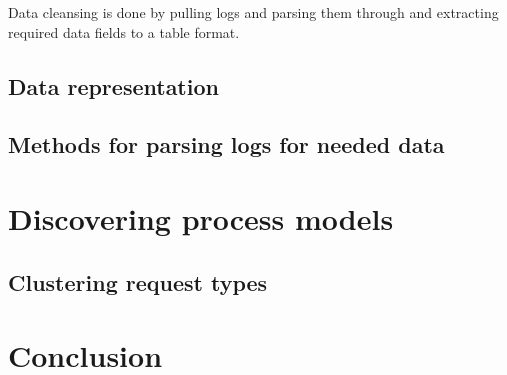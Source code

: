 \documentclass[a4paper, 12pt]{article}
\let\stdsection\section
\renewcommand\section{\newpage\stdsection}
\begin{document}
Data cleansing is done by pulling logs and parsing them through and extracting required data fields to a table format. 
\subsection{Data representation}

\subsection{Methods for parsing logs for needed data}

\section{Discovering process models}

\subsection{Clustering request types}


\section{Conclusion}
\label{Conclusion} 
\pagebreak


\footnotesize
{}
\end{document}
